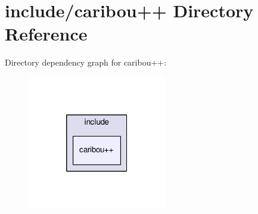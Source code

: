 \section{include/caribou++ Directory Reference}
\label{dir_2f70baa5e10b64e1d09d275834f53854}
Directory dependency graph for caribou++\+:
\nopagebreak
\begin{figure}[H]
\begin{center}
\leavevmode
\includegraphics[width=172pt]{dir_2f70baa5e10b64e1d09d275834f53854_dep}
\end{center}
\end{figure}
